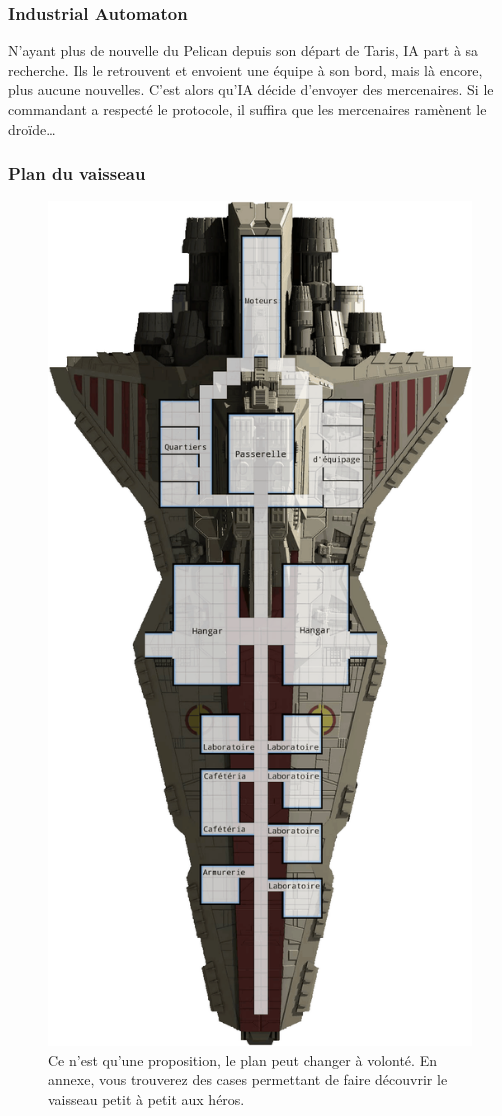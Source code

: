 \vspace{10\baselineskip}
\subsubsection{Industrial Automaton}
N’ayant plus de nouvelle du Pelican depuis son départ de Taris, IA part à sa recherche. Ils le retrouvent et envoient une équipe à son bord, mais là encore, plus aucune nouvelles. C’est alors qu’IA décide d’envoyer des mercenaires. Si le commandant a respecté le protocole, il suffira que les mercenaires ramènent le droïde\ldots

\onecolumn
\subsubsection{Plan du vaisseau}

\begin{figure}[!h]
	\centering
	\includegraphics[height=0.87\textheight]{_img/venator-plan.png}
	\caption{Ce n’est qu’une proposition, le plan peut changer à volonté. En annexe, vous trouverez des cases permettant de faire découvrir le vaisseau petit à petit aux héros.}
\end{figure}

\twocolumn
